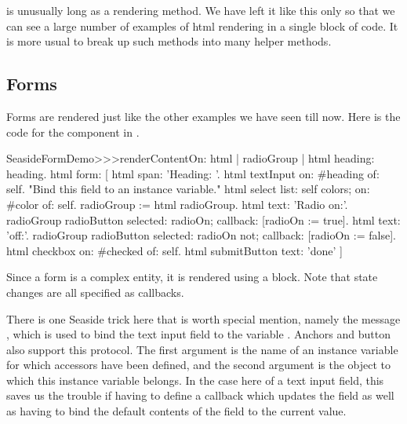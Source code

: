 \documentclass[a4paper,10pt,twoside]{book}
\begin{document}

 is unusually long as a rendering method.
We have left it like this only so that we can see a large number of examples of html rendering in a single block of code.
It is more usual to break up such methods into many helper methods.


\subsection{Forms}

Forms are rendered just like the other examples we have seen till now.
Here is the code for the  component in .

\begin{code}{}
SeasideFormDemo>>>renderContentOn: html
	| radioGroup |
	html heading: heading.
	html form: [
		html span: 'Heading: '.
		html textInput on: #heading of: self. "Bind this field to an instance variable."
		html select
			list: self colors;
			on: #color of: self.
		radioGroup := html radioGroup.
		html text: 'Radio on:'.
		radioGroup radioButton
			selected: radioOn;
			callback: [radioOn := true].
		html text: 'off:'.
		radioGroup radioButton
			selected: radioOn not;
			callback: [radioOn := false].
		html checkbox on: #checked of: self.
		html submitButton
			text: 'done'
		]
\end{code}{}

Since a form is a complex entity, it is rendered using a block.
Note that state changes are all specified as callbacks.

There is one Seaside trick here that is worth special mention, namely the message , which is used to bind the text input field to the variable .
Anchors and button also support this protocol.
The first argument is the name of an instance variable for which accessors have been defined, and the second argument is the object to which this instance variable belongs.
In the case here of a text input field, this saves us the trouble if having to define a callback which updates the field as well as having to bind the default contents of the field to the current value.
\end{document}
